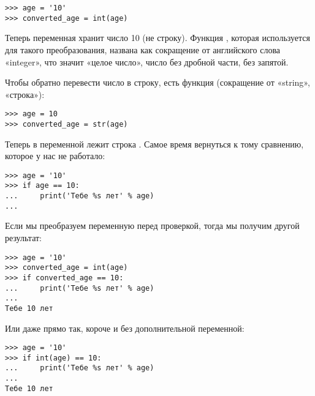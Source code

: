\begin{listing}
\begin{verbatim}
>>> age = '10'
>>> converted_age = int(age)
\end{verbatim}
\end{listing}

Теперь переменная  хранит число 10 (не строку). Функция , которая используется для такого преобразования, названа как сокращение от английского слова «integer», что значит «целое число», число без дробной части, без запятой.

Чтобы обратно перевести число в строку, есть функция  (сокращение от «string», «строка»):

\begin{listing}
\begin{verbatim}
>>> age = 10
>>> converted_age = str(age)
\end{verbatim}
\end{listing}

Теперь в переменной  лежит строка . Самое время вернуться к тому сравнению, которое у нас не работало:

\begin{listing}
\begin{verbatim}
>>> age = '10'
>>> if age == 10:
...     print('Тебе %s лет' % age)
...
\end{verbatim}
\end{listing}

Если мы преобразуем переменную перед проверкой, тогда мы получим другой результат:

\begin{listing}
\begin{verbatim}
>>> age = '10'
>>> converted_age = int(age)
>>> if converted_age == 10:
...     print('Тебе %s лет' % age)
...
Тебе 10 лет
\end{verbatim}
\end{listing}

Или даже прямо так, короче и без дополнительной переменной:

\begin{listing}
\begin{verbatim}
>>> age = '10'
>>> if int(age) == 10:
...     print('Тебе %s лет' % age)
...
Тебе 10 лет
\end{verbatim}
\end{listing}
